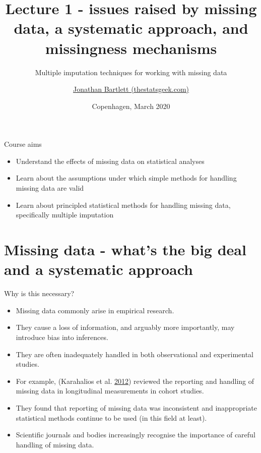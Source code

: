 \documentclass[ignorenonframetext,]{beamer}
\title{Lecture 1 - issues raised by missing data, a systematic approach, and
missingness mechanisms}
\subtitle{Multiple imputation techniques for working with missing data}
\author{\href{https://thestatsgeek.com}{Jonathan Bartlett (thestatsgeek.com)}}
\date{Copenhagen, March 2020}
\providecommand{\tightlist}{%
  \setlength{\itemsep}{0pt}\setlength{\parskip}{0pt}}
\begin{document}
\frame{\titlepage}

\begin{frame}
\tableofcontents[hideallsubsections]
\end{frame}
\begin{frame}{Course aims}
\protect\hypertarget{course-aims}{}

\begin{itemize}
\tightlist
\item
  Understand the effects of missing data on statistical analyses
\item
  Learn about the assumptions under which simple methods for handling
  missing data are valid
\item
  Learn about principled statistical methods for handling missing data,
  specifically multiple imputation
\end{itemize}

\end{frame}

\hypertarget{missing-data---whats-the-big-deal-and-a-systematic-approach}{%
\section{Missing data - what's the big deal and a systematic
approach}\label{missing-data---whats-the-big-deal-and-a-systematic-approach}}

\begin{frame}{Why is this necessary?}
\protect\hypertarget{why-is-this-necessary}{}

\begin{itemize}
\tightlist
\item
  Missing data commonly arise in empirical research.
\item
  They cause a loss of information, and arguably more importantly, may
  introduce bias into inferences.
\item
  They are often inadequately handled in both observational and
  experimental studies.
\item
  For example, (Karahalios et al.
  \protect\hyperlink{ref-karahalios2012review}{2012}) reviewed the
  reporting and handling of missing data in longitudinal measurements in
  cohort studies.
\item
  They found that reporting of missing data was inconsistent and
  inappropriate statistical methods continue to be used (in this field
  at least).
\item
  Scientific journals and bodies increasingly recognise the importance
  of careful handling of missing data.
\end{itemize}

\end{frame}
\end{document}
